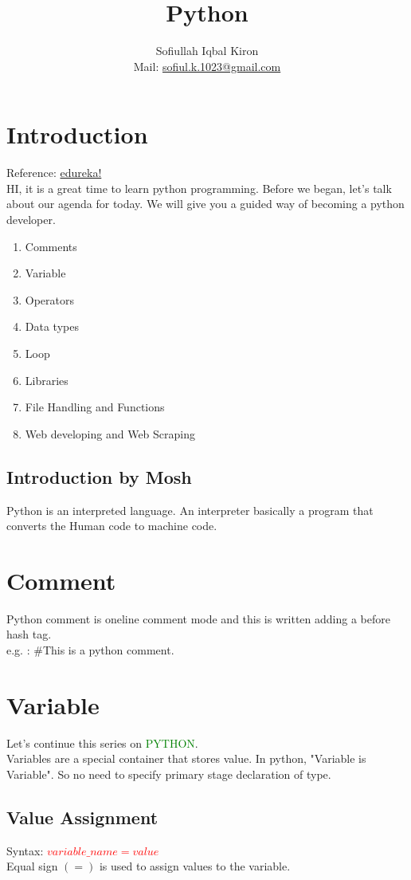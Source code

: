 \documentclass[11 pt, letterpaper]{report}
\title{Python}
\author
{
 Sofiullah Iqbal Kiron\\
 Mail: \href{mailto:sofiul.k.1023@gmail.com}{sofiul.k.1023@gmail.com}
}
\affil{BSMRSTU, Department of CSE}
\begin{document}
\maketitle
\tableofcontents

\section{Introduction}
Reference: \href{https://www.youtube.com/watch?v=WGJJIrtnfpk&t=12362s}{edureka!}\\
HI, it is a great time to learn python programming. Before we began, let's talk about our agenda for today. We will give you a guided way of becoming a python developer.\\
\begin{enumerate}
 \item Comments
 \item Variable
 \item Operators
 \item Data types
 \item Loop
 \item Libraries
 \item File Handling and Functions
 \item Web developing and Web Scraping
\end{enumerate}

\subsection{Introduction by Mosh}
Python is an interpreted language. An interpreter basically a program that converts the Human code to machine code.

\section{Comment}
Python comment is oneline comment mode and this is written adding a before hash tag.\\
e.g. : \#This is a python comment.

\section{Variable}
Let's continue this series on \textcolor{green}{PYTHON}.\\
Variables are a special container that stores value. In python, "Variable is Variable". So no need to specify primary stage declaration of type.
\subsection{Value Assignment}
Syntax: \textcolor{red}{$variable\_name = value$}\\
Equal sign $( = )$ is used to assign values to the variable.
\end{document}
